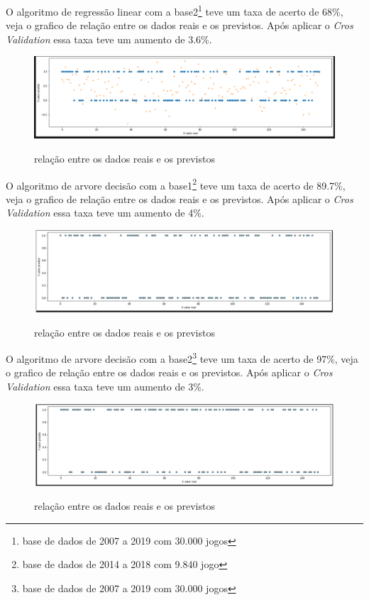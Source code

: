 O algoritmo de regressão linear com a base2\footnote[5]{base de dados de 2007 a 2019 com 30.000 jogos} teve um taxa de acerto de 68\%, veja o grafico de relação entre os dados reais e os previstos. Após aplicar o \textit{Cros Validation} essa taxa teve um aumento de 3.6\%.
\begin{figure}[htbp]
	\begin{center}
		\includegraphics[width=0.7\linewidth]{imagens/regressailinearAPI.png}\\
	\end{center}
	\caption[relação entre os dados reais e os previstos]{relação entre os dados reais e os previstos}
	\label{fig:logo}
\end{figure}

O algoritmo de arvore decisão com a base1\footnote[4]{base de dados de 2014 a 2018 com 9.840 jogo} teve um taxa de acerto de 89.7\%, veja o grafico de relação entre os dados reais e os previstos. Após aplicar o \textit{Cros Validation} essa taxa teve um aumento de 4\%.
\begin{figure}[htbp]
	\begin{center}
		\includegraphics[width=0.7\linewidth]{imagens/arvoredecisao.png}\\
	\end{center}
	\caption[relação entre os dados reais e os previstos]{relação entre os dados reais e os previstos}
	\label{fig:logo}
\end{figure}

O algoritmo de arvore decisão com a base2\footnote[5]{base de dados de 2007 a 2019 com 30.000 jogos} teve um taxa de acerto de 97\%, veja o grafico de relação entre os dados reais e os previstos. Após aplicar o \textit{Cros Validation} essa taxa teve um  aumento de 3\%.
\begin{figure}[htbp]
	\begin{center}
		\includegraphics[width=0.7\linewidth]{imagens/arvoredecisaoAPI.png}\\
	\end{center}
	\caption[relação entre os dados reais e os previstos]{relação entre os dados reais e os previstos}
	\label{fig:logo}
\end{figure}

